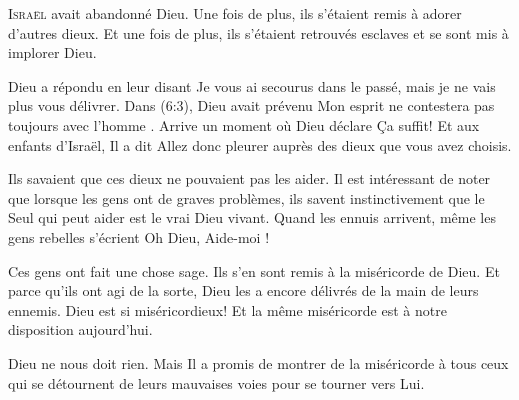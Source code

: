 



\lettrine{I}{sraël} avait abandonné Dieu.
 Une fois de plus, ils s'étaient remis à adorer d'autres dieux.
 Et une fois de plus, ils s'étaient retrouvés esclaves
 et se sont mis à implorer Dieu.

Dieu a répondu en leur disant\frcolon{}
 \Og Je vous ai secourus dans le passé,
 mais je ne vais plus vous délivrer. \Fg{}
 Dans (6:3), Dieu avait prévenu\frcolon{}
 \Og Mon esprit ne contestera pas toujours avec l'homme \Fg{}.
 Arrive un moment où Dieu déclare\frcolon{} \Og Ça suffit! \Fg{}
 Et aux enfants d'Israël, Il a dit\frcolon{}
 \Og Allez donc pleurer auprès des dieux que vous avez choisis. \Fg{}

Ils savaient que ces dieux ne pouvaient pas les aider.
 Il est intéressant de noter que lorsque les gens ont de graves problèmes,
 ils savent instinctivement que le Seul qui peut aider est le vrai Dieu vivant.
 Quand les ennuis arrivent, même les gens rebelles s'écrient\frcolon{}
 \Og Oh Dieu, Aide-moi ! \Fg{}


Ces gens ont fait une chose sage. Ils s'en sont remis à la miséricorde de Dieu.
 Et parce qu'ils ont agi de la sorte, Dieu les a encore délivrés
 de la main de leurs ennemis. Dieu est si miséricordieux!
 Et la même miséricorde est à notre disposition aujourd'hui.

Dieu ne nous doit rien. Mais Il a promis de montrer de la miséricorde
 à tous ceux qui se détournent de leurs mauvaises voies
 pour se tourner vers Lui. 

